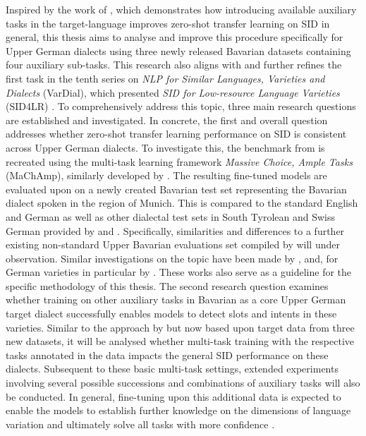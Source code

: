 \documentclass[11pt,a4paper,twoside,openright]{scrbook}
\begin{document}
Inspired by the work of \citet{van-der-goot-etal-2021-masked}, which demonstrates how introducing available auxiliary tasks in the target-language improves zero-shot transfer learning on SID in general, this thesis aims to analyse and improve this procedure specifically for Upper German dialects using three newly released Bavarian datasets containing four auxiliary sub-tasks. This research also aligns with and further refines the first task in the tenth series on \textit{NLP for Similar Languages, Varieties and Dialects} (VarDial), which presented \textit{SID for Low-resource Language Varieties} (SID4LR) \citep{2023-findings-vardial}. To comprehensively address this topic, three main research questions are established and investigated. 
In concrete, the first and overall question addresses whether zero-shot transfer learning performance on SID is consistent across Upper German dialects. To investigate this, the benchmark from \citet{van-der-goot-etal-2021-masked} is recreated using the multi-task learning framework \textit{Massive Choice, Ample Tasks} (MaChAmp), similarly developed by \citet{van-der-goot-etal-2021-massive}. The resulting fine-tuned models are evaluated upon on a newly created Bavarian test set representing the Bavarian dialect spoken in the region of Munich. This is compared to the standard English and German as well as other dialectal test sets in South Tyrolean and Swiss German provided by \citet{van-der-goot-etal-2021-masked} and \citet{2023-findings-vardial}. Specifically, similarities and differences to a further existing non-standard Upper Bavarian evaluations set compiled by \citet{winkler-etal-2024-slot-intent} will under observation. Similar investigations on the topic have been made by \citet{kwon-etal-2023-sidlr}, \citet{srivastava-chiang-2023-fine} and, for German varieties in particular by \citet{artemova-etal-2024-exploring}. These works also serve as a guideline for the specific methodology of this thesis. 
The second research question examines whether training on other auxiliary tasks in Bavarian as a core Upper German target dialect successfully enables models to detect slots and intents in these varieties. Similar to the approach by \citet{van-der-goot-etal-2021-masked} but now based upon target data from three new datasets, it will be analysed whether multi-task training with the respective tasks annotated in the data impacts the general SID performance on these dialects. Subsequent to these basic multi-task settings, extended experiments involving several possible successions and combinations of auxiliary tasks will also be conducted. In general, fine-tuning upon this additional data is expected to enable the models to establish further knowledge on the dimensions of language variation and ultimately solve all tasks with more confidence \citep{Zampieri_Nakov_Scherrer_2020}.
\end{document}
